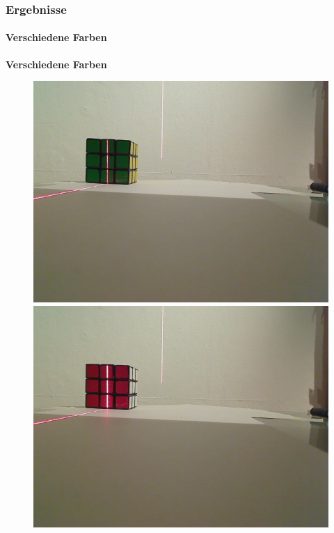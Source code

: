 \documentclass[xcolor=dvipsnames]{beamer}
\begin{document}
\begin{frame}
	\frametitle{Ergebnisse}
	\framesubtitle{Verschiedene Farben}

	\textbf{Verschiedene Farben}

	\begin{figure}
		\begin{minipage}{0.32\linewidth}
			\includegraphics[width=\linewidth]{includes/test_color_1}
		\end{minipage}
		\hfill
		\begin{minipage}{0.32\linewidth}
			\includegraphics[width=\linewidth]{includes/test_color_2}

\end{minipage}
\end{figure}
\end{frame}
\end{document}
